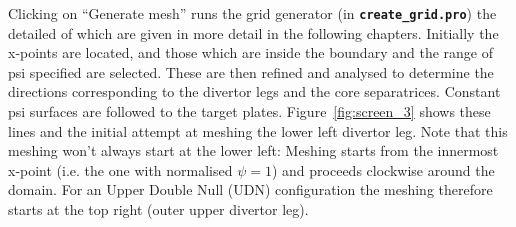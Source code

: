 \documentclass[12pt, a4paper]{article}
\newcommand{\file}[1]{\texttt{\bf #1}}
\begin{document}
\clearpage
Clicking on ``Generate mesh'' runs the grid generator (in \file{create\_grid.pro})
the detailed of which are given in more detail in the following chapters.
Initially the x-points are located, and those which are inside the boundary and the range of psi specified are selected. These are then refined and analysed to
determine the directions corresponding to the divertor legs and the core
separatrices. Constant psi surfaces are followed to the target plates.
Figure~\ref{fig:screen_3} shows these lines and the initial attempt at
meshing the lower left divertor leg. Note that this meshing won't always
start at the lower left: Meshing starts from the innermost x-point
(i.e. the one with normalised $\psi = 1$) and proceeds clockwise around the
domain. For an Upper Double Null (UDN) configuration
the meshing therefore starts at the top right (outer upper divertor leg).
\end{document}
